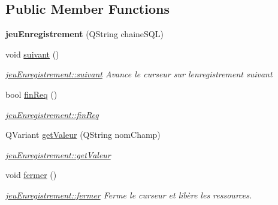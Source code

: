 \subsection*{Public Member Functions}
\begin{DoxyCompactItemize}
\item 
\mbox{\label{classjeu_enregistrement_a9ea63096be94ef11f0fd08d6554aa115}} 
{\bfseries jeu\+Enregistrement} (Q\+String chaine\+S\+QL)
\item 
\mbox{\label{classjeu_enregistrement_aa26dd78c24b4fbaec948380d8907d4d9}} 
void \hyperlink{classjeu_enregistrement_aa26dd78c24b4fbaec948380d8907d4d9}{suivant} ()
\begin{DoxyCompactList}\small\item\em \hyperlink{classjeu_enregistrement_aa26dd78c24b4fbaec948380d8907d4d9}{jeu\+Enregistrement\+::suivant} Avance le curseur sur l\textquotesingle{}enregistrement suivant \end{DoxyCompactList}\item 
bool \hyperlink{classjeu_enregistrement_ad4689ab49e4a51fde86e3b00e15e473e}{fin\+Req} ()
\begin{DoxyCompactList}\small\item\em \hyperlink{classjeu_enregistrement_ad4689ab49e4a51fde86e3b00e15e473e}{jeu\+Enregistrement\+::fin\+Req} \end{DoxyCompactList}\item 
Q\+Variant \hyperlink{classjeu_enregistrement_acd8e0e1bc08d6b1a5c5966d565e134a2}{get\+Valeur} (Q\+String nom\+Champ)
\begin{DoxyCompactList}\small\item\em \hyperlink{classjeu_enregistrement_acd8e0e1bc08d6b1a5c5966d565e134a2}{jeu\+Enregistrement\+::get\+Valeur} \end{DoxyCompactList}\item 
\mbox{\label{classjeu_enregistrement_adee0dc84769c49230dbd6b32ec0bd946}} 
void \hyperlink{classjeu_enregistrement_adee0dc84769c49230dbd6b32ec0bd946}{fermer} ()
\begin{DoxyCompactList}\small\item\em \hyperlink{classjeu_enregistrement_adee0dc84769c49230dbd6b32ec0bd946}{jeu\+Enregistrement\+::fermer} Ferme le curseur et libère les ressources. \end{DoxyCompactList}\end{DoxyCompactItemize}



